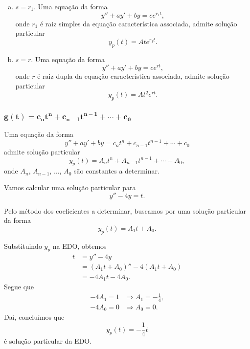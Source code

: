 \begin{obs}
  \begin{enumerate}[a)]
  \item $s = r_1$.
    Uma equação da forma
    \begin{equation}
      y'' + ay' + by = ce^{r_1t},
    \end{equation}
    onde $r_1$ é raiz simples da equação característica associada, admite solução particular
    \begin{equation}
      y_p(t) = Ate^{r_1t}.
    \end{equation}
  \item $s = r$.
    Uma equação da forma
    \begin{equation}
      y'' + ay' + by = ce^{rt},
    \end{equation}
    onde $r$ é raiz dupla da equação característica associada, admite solução particular
    \begin{equation}
      y_p(t) = At^2e^{rt}.
    \end{equation}
  \end{enumerate}
\end{obs}

\subsubsection{$\pmb{g(t) = c_nt^n + c_{n-1}t^{n-1} + \cdots + c_0}$}

Uma equação da forma
\begin{equation}
  y'' + ay' + by = c_nt^n + c_{n-1}t^{n-1} + \cdots + c_0
\end{equation}
admite solução particular
\begin{equation}
  y_p(t) = A_nt^n + A_{n-1}t^{n-1} + \cdots + A_0,
\end{equation}
onde $A_n$, $A_{n-1}$, $\dotsc$, $A_0$ são constantes a determinar.

\begin{ex}
  Vamos calcular uma solução particular para
  \begin{equation}
    y'' - 4y = t.
  \end{equation}

  Pelo método dos coeficientes a determinar, buscamos por uma solução particular da forma
  \begin{equation}
    y_p(t) = A_1t + A_0.
  \end{equation}

  Substituindo $y_p$ na EDO, obtemos
  \begin{align}
    t &= y'' - 4y \\
      &= \left(A_1t + A_0\right)'' - 4(A_1t + A_0) \\
           &= -4A_1t - 4A_0.
  \end{align}
  Segue que
  \begin{align}
    -4A_1 = 1 &\Rightarrow A_1 = -\frac{1}{4},\\
    -4A_0 = 0 &\Rightarrow A_0 = 0.
  \end{align}
  Daí, concluímos que
  \begin{equation}
    y_p(t) = -\frac{1}{4}t
  \end{equation}
  é solução particular da EDO.
\end{ex}

